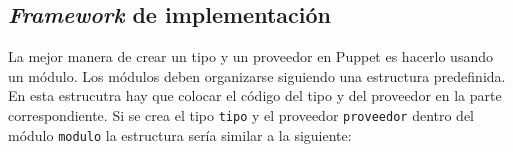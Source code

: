 \subsection{\emph{Framework} de implementación}
\label{sec:modelado-framework}





La mejor manera de crear un tipo y un proveedor en Puppet es hacerlo usando un módulo. Los módulos deben organizarse siguiendo una estructura predefinida. En esta estrucutra hay que colocar el código del tipo y del proveedor en la parte correspondiente. Si se crea el tipo \texttt{tipo} y el proveedor \texttt{proveedor} dentro del módulo \texttt{modulo} la estructura sería similar a la siguiente:

